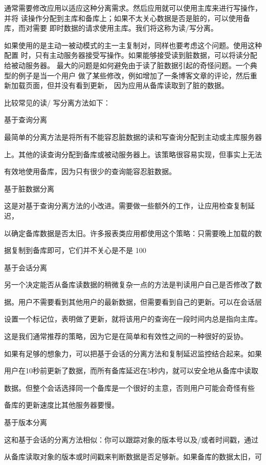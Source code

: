 通常需要修改应用以适应这种分离需求。然后应用就可以使用主库来进行写操作，并将
读操作分配到主库和备库上；如果不太关心数据是否是脏的，可以使用备库，而对需要
即时数据的请求使用主库。我们将这称为读/写分离。

如果使用的是主动一被动模式的主一主复制对，同样也要考虑这个问题。使用这种配置
时，只有主动服务器接受写操作。如果能够接受读到脏数据，可以将读分配给被动服务器。
最大的问题是如何避免由于读了脏数据引起的奇怪问题。一个典型的例子是当一个用户
做了某些修改，例如增加了一条博客文章的评论，然后重新加载页面，但并没有看到更新，
因为应用从备库读取到了脏的数据。

比较常见的读/ 写分离方法如下：

基于查询分离

最简单的分离方法是将所有不能容忍脏数据的读和写查询分配到主动或主库服务器

上。其他的读查询分配到备库或被动服务器上。该策略很容易实现，但事实上无法

有效地使用备库，因为只有很少的查询能容忍脏数据。

基于脏数据分离

这是对基于查询分离方法的小改进。需要做一些额外的工作，让应用检查复制延迟，

以确定备库数据是否太旧。许多报表类应用都使用这个策略：只需要晚上加载的数

据复制到备库即可，它们并不关心是不是 100%

基于会话分离

另一个决定能否从备库读数据的稍微复杂一点的方法是判读用户自己是否修改了数

据。用户不需要看到其他用户的最新数据，但需要看到自己的更新。可以在会话层

设置一个标记位，表明做了更新，就将该用户的查询在一段时间内总是指向主库。

这是我们通常推荐的策略，因为它是在简单和有效性之间的一种很好的妥协。

如果有足够的想象力，可以把基于会话的分离方法和复制延迟监控结合起来。如果

用户在10秒前更新了数据，而所有备库延迟在5秒内，就可以安全地从备库中读取

数据。但整个会话选择同一个备库是一个很好的主意，否则用户可能会奇怪有些

备库的更新速度比其他服务器要慢。

基于版本分离

这和基于会话的分离方法相似：你可以跟踪对象的版本号以及/或者时间戳，通过

从备库读取对象的版本或时间戳来判断数据是否足够新。如果备库的数据太旧，可

